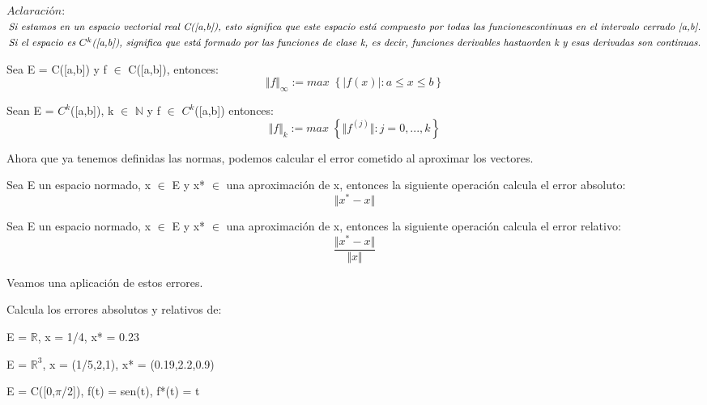 $\textit{Aclaración:}$\\
$\textit{Si estamos en un espacio vectorial real C([a,b]), esto significa que este espacio está compuesto por todas las funciones}\\
\textit{continuas en el intervalo cerrado [a,b].}$\\
$\textit{Si el espacio es $C^k$([a,b]), significa que está formado por las funciones de clase k, es decir, funciones derivables hasta}\\
\textit{orden k y esas derivadas son continuas.}$

\begin{ndef}
Sea E = C([a,b]) y f $\in$ C([a,b]), entonces:
\[ \Vert f \Vert _\infty := max \; \left\lbrace \vert f(x) \vert : a \leq x \leq b \right\rbrace \]
\end{ndef}

\begin{ndef}
Sean E = $C^k$([a,b]), k $\in$ $\mathbb{N}$ y f $\in$ $C^k$([a,b]) entonces:
\[ \Vert f \Vert _k := max \; \left\lbrace \Vert f^{(j)} \Vert : j = 0,...,k \right\rbrace \]
\end{ndef}

Ahora que ya tenemos definidas las normas, podemos calcular el error cometido al aproximar los vectores.

\begin{ndef}
Sea E un espacio normado, x $\in$ E y x* $\in$ una aproximación de x, entonces la siguiente operación calcula el error absoluto:
\[ \Vert x^* - x \Vert \]
\end{ndef}

\begin{ndef}
Sea E un espacio normado, x $\in$ E y x* $\in$ una aproximación de x, entonces la siguiente operación calcula el error relativo:
\[  \frac {\Vert x^* - x \Vert}{ \Vert x \Vert} \]
\end{ndef}

Veamos una aplicación de estos errores.

\begin{ejer}
Calcula los errores absolutos y relativos de:
	\begin{nlist}
	\item E = $\mathbb{R}$, x = 1/4, x* = 0.23
	\item E = $\mathbb{R}^3$, x = (1/5,2,1), x* = (0.19,2.2,0.9)
	\item E = C([0,$\pi$/2]), f(t) = sen(t), f*(t) = t
	\end{nlist}
\end{ejer}

